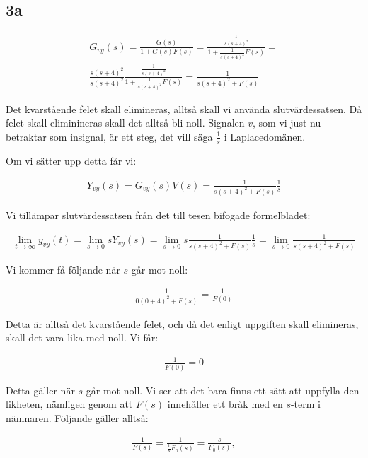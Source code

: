 \documentclass[a4paper]{article}
\begin{document}
\subsection{3a}
\begin{align*}
  G_{vy}(s) = \frac{G(s)}{1 + G(s)F(s)} = \frac{\frac{1}{s(s+4)^2}}{1 + \frac{1}{s(s+4)^2}F(s)} = \\
  \frac{s(s+4)^2}{s(s+4)^2}\frac{\frac{1}{s(s+4)^2}}{1 + \frac{1}{s(s+4)^2}F(s)} = \frac{1}{s(s+4)^2 + F(s)}
\end{align*}

Det kvarstående felet skall elimineras, alltså skall vi använda slutvärdessatsen. Då felet skall eliminineras skall det alltså bli noll. Signalen $v$, som vi just nu betraktar som insignal, är ett steg, det vill säga $\frac{1}{s}$ i Laplacedomänen.

Om vi sätter upp detta får vi:

\begin{align*}
  Y_{vy}(s) = G_{vy}(s) V(s) = \frac{1}{s(s+4)^2 + F(s)} \frac{1}{s}
\end{align*}

Vi tillämpar slutvärdessatsen från det till tesen bifogade formelbladet:

\begin{align*}
  \lim_{t \rightarrow \infty} y_{vy}(t) = \lim_{s \rightarrow 0} sY_{vy}(s) = \lim_{s \rightarrow 0} s \frac{1}{s(s+4)^2 + F(s)} \frac{1}{s} = \lim_{s \rightarrow 0} \frac{1}{s(s+4)^2 + F(s)}
\end{align*}

Vi kommer få följande när $s$ går mot noll:

\begin{align*}
  \frac{1}{0(0+4)^2 + F(s)} = \frac{1}{F(0)}
\end{align*}

Detta är alltså det kvarstående felet, och då det enligt uppgiften skall elimineras, skall det vara lika med noll. Vi får:

\begin{align*}
  \frac{1}{F(0)} = 0
\end{align*}

Detta gäller när $s$ går mot noll. Vi ser att det bara finns ett sätt att uppfylla den likheten, nämligen genom att $F(s)$ innehåller ett bråk med en $s$-term i nämnaren. Följande gäller alltså:

\begin{align*}
  \frac{1}{F(s)} = \frac{1}{\frac{1}{s}F_0(s)} = \frac{s}{F_0(s)},
\end{align*}
\end{document}
